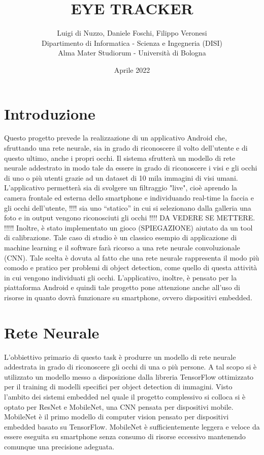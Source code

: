 \documentclass[11pt]{article}
\title{EYE TRACKER}
\author{Luigi di Nuzzo,
Daniele Foschi,
Filippo Veronesi\\
\AND
\AND
\AND
\AND
\AND
	Dipartimento di Informatica - Scienza e Ingegneria (DISI)\\
\AND
Alma Mater Studiorum - Università di Bologna\\
}
\date{Aprile 2022}
\begin{document}
\maketitle

\newpage
\tableofcontents
\thispagestyle{empty}

\newpage






\newpage
\setcounter{page}{1}
\section{Introduzione}
Questo progetto prevede la realizzazione di un applicativo Android che, sfruttando una rete neurale,
sia in grado di riconoscere il volto dell’utente e di questo ultimo, anche i propri occhi. Il sistema sfrutterà un modello di rete neurale
addestrato in modo tale da essere in grado di riconoscere i visi e gli occhi di uno o più utenti grazie ad un dataset di 10 mila immagini di visi umani.
L’applicativo permetterà sia di svolgere un filtraggio "live", cioè aprendo la camera frontale ed esterna dello smartphone
e individuando real-time la faccia e gli occhi dell’utente, !!!! sia uno “statico” in cui si selezionano dalla galleria
una foto e in output vengono riconosciuti gli occhi !!!! DA VEDERE SE METTERE. !!!!!
\newline
Inoltre, è stato implementato un gioco (SPIEGAZIONE) aiutato da un tool di calibrazione.
\newline \newline
Tale caso di studio è un classico esempio di applicazione di machine learning e il software farà ricorso
a una rete neurale convoluzionale (CNN). Tale scelta è dovuta al fatto che una rete neurale
rappresenta il modo più comodo e pratico per problemi di object detection, come quello di questa
attività in cui vengono individuati gli occhi.
\newline \newline
L’applicativo, inoltre, è pensato per la piattaforma Android e quindi tale progetto pone attenzione
anche all’uso di risorse in quanto dovrà funzionare su smartphone, ovvero dispositivi embedded.

\newpage

\section{Rete Neurale}
L’obbiettivo primario di questo task è produrre un modello di rete neurale addestrata in grado di
riconoscere gli occhi di una o più persone. A tal scopo si è utilizzato un modello messo a disposizione dalla libreria
TensorFlow ottimizzato per il training di modelli specifici per object detection di immagini. Visto
l’ambito dei sistemi embedded nel quale il progetto complessivo si colloca si è optato per ResNet e MobileNet,
una CNN pensata per dispositivi mobile. MobileNet è il primo modello di computer vision pensato
per dispositivi embedded basato su TensorFlow. MobileNet è sufficientemente leggera e veloce da
essere eseguita su smartphone senza consumo di risorse eccessivo mantenendo comunque una
precisione adeguata.
\end{document}
